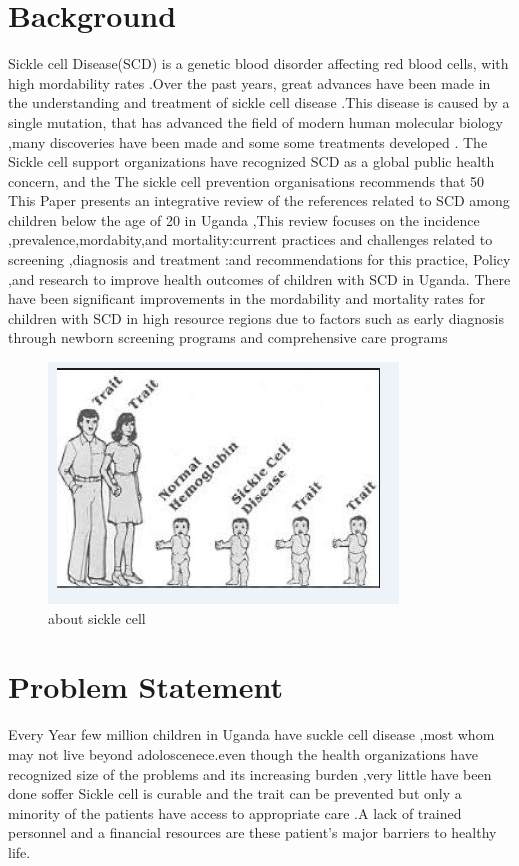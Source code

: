\documentclass[12pt,]{article}
\begin{document}
\section{Background}
Sickle cell Disease(SCD) is a genetic blood disorder affecting red blood cells, with high mordability rates .Over the past years, great advances have been made in the understanding and treatment of sickle cell disease .This disease is caused by a single mutation, that has advanced the field of modern human molecular biology ,many discoveries have been made and some some treatments developed . The Sickle cell support organizations have recognized SCD as a global public health concern, and the The sickle cell prevention organisations recommends that 50%
This Paper presents an integrative review of the references related to SCD among children below the age of 20 in Uganda ,This review focuses on the incidence ,prevalence,mordabity,and mortality:current practices and challenges related to screening ,diagnosis and treatment :and recommendations for this practice, Policy ,and research to improve health outcomes of children with SCD in Uganda.
There have been significant improvements in the mordability and mortality rates for children with SCD in high resource regions due to factors such as early diagnosis through newborn screening programs and comprehensive care programs 
\begin{figure}
\includegraphics[width=\linewidth]{intro.png}
\caption{about sickle cell}
\end{figure}
\newpage
\newpage
\section{Problem Statement}
Every Year few million children in Uganda have suckle cell disease ,most whom may not live beyond adoloscenece.even though the health organizations have  recognized size of the problems and its increasing burden ,very little have been done soffer Sickle cell is curable and the trait can be prevented but only a minority of the patients have access to appropriate care .A lack of trained personnel and a financial resources are these patient’s major barriers to healthy life.
\end{document}
